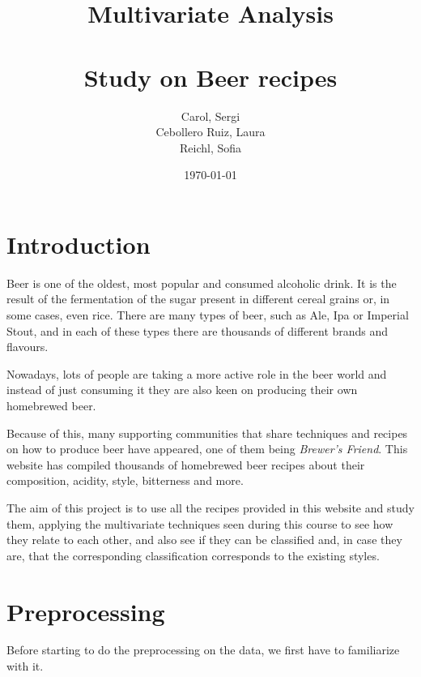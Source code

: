 
%


\title{ \Large Multivariate Analysis \\~\\  \huge \textbf{Study on Beer recipes}}
\author{Carol, Sergi \\ Cebollero Ruiz, Laura \\ Reichl, Sofia}
\date{\today}



\maketitle


\tableofcontents

\newpage
\section{Introduction}
Beer is one of the oldest, most popular and consumed alcoholic drink. It is the result of the fermentation of the sugar present in different cereal grains or, in some cases, even rice. There are many types of beer, such as Ale, Ipa or Imperial Stout, and in each of these types there are thousands of different brands and flavours.

Nowadays, lots of people are taking a more active role in the beer world and instead of just consuming it they are also keen on producing their own homebrewed beer. 

Because of this, many supporting communities that share techniques and recipes on how to produce beer have appeared, one of them being \textit{Brewer's Friend}. This website has compiled thousands of homebrewed beer recipes about their composition, acidity, style, bitterness and more.

The aim of this project is to use all the recipes provided in this website and study them, applying the multivariate techniques seen during this course to see how they relate to each other, and also see if they can be classified and, in case they are, that the corresponding classification corresponds to the existing styles.

\section{Preprocessing}

Before starting to do the preprocessing on the data, we first have to familiarize with it.

